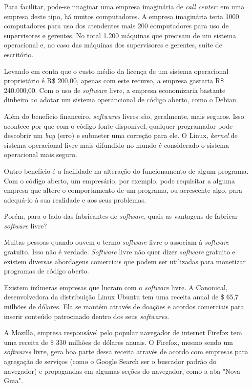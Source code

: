 \documentclass{classe_cn}                 %
\begin{document}
Para facilitar, pode-se imaginar uma empresa imaginária de \textit{call center}: em uma empresa deste tipo, há muitos computadores. A empresa imaginária teria 1000 computadores para uso dos atendentes mais 200 computadores para uso de supervisores e gerentes. No total 1.200 máquinas que precisam de um sistema operacional e, no caso das máquinas dos supervisores e gerentes, suíte de escritório.

Levando em conta que o custo médio da licença de um sistema operacional proprietário é R\$ 200,00, apenas com este recurso, a empresa gastaria R\$ 240.000,00. Com o uso de \textit{software} livre, a empresa economizaria bastante dinheiro ao adotar um sistema operancional de código aberto, como o Debian.

Além do benefício financeiro, \textit{softwares} livres são, geralmente, mais seguros. Isso acontece por que com o código fonte disponível, qualquer programador pode descobrir um \textit{bug} (erro) e submeter uma correção para ele. O Linux, \textit{kernel} de sistema operacional livre mais difundido no mundo é considerado o sistema operacional mais seguro.

Outro benefício é a facilidade na alteração do funcionamento de algum programa. Com o código aberto, um empresário, por exemplo, pode requisitar a alguma empresa que altere o comportamento de um programa, ou acrescente algo, para adequá-lo à sua realidade e aos seus problemas.

Porém, para o lado das fabricantes de \textit{software}, quais as vantagens de fabricar \textit{software} livre?

Muitas pessoas quando ouvem o termo \textit{software} livre o associam à \textit{software} gratuito. Isso não é verdade. \textit{Software} livre não quer dizer \textit{software} gratuito e existem diversas abordagens comerciais que podem ser utilizadas para monetizar programas de código aberto.

Existem inúmeras empresas que lucram com o \textit{software} livre. A Canonical, desenvolvedora da distribuição Linux Ubuntu tem uma receita anual de \$ 65,7 milhões de dólares. Ela se mantém através de doações e acordos comerciais para inserir conteúdo patrocinado dentro dos seus \textit{softwares}.

A Mozilla, empresa responsável pelo popular navegador de internet Firefox tem uma receita de \$ 330 milhões de dólares anuais. O Firefox, mesmo sendo  um \textit{softwares} livre, gera boa parte dessa receita através de acordo com empresas para agregação de serviços (como o Google Search ser o buscador padrão do navegador) e propagandas em algumas seções do navegador, como a aba "Nova Guia".
\end{document}
